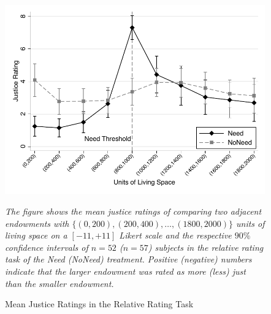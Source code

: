 \documentclass[12pt]{scrartcl}
\begin{document}
\begin{figure}[h]
   \centering
   \includegraphics{figures/figure_2.pdf}
   \begin{minipage}{\linewidth}
      \footnotesize
      \textit{The figure shows the mean justice ratings of comparing two adjacent endowments with $\{(0,200),(200,400),\ldots,(1800,2000)\}$ units of living space on a $[-11,+11]$ Likert scale and the respective $90\%$ confidence intervals of $n=52$ ($n=57$) subjects in the relative rating task of the Need (NoNeed) treatment. Positive (negative) numbers indicate that the larger endowment was rated as more (less) just than the smaller endowment.}
   \end{minipage}
   \caption{Mean Justice Ratings in the Relative Rating Task}
   \label{fig:relative_ratings_full}
\end{figure}
\end{document}
